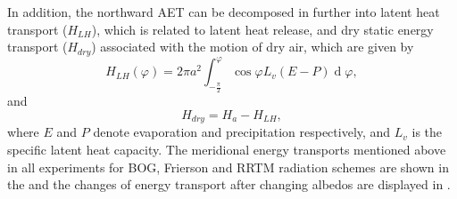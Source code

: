 In addition, the northward AET can be decomposed in further into latent heat transport ($H_{LH}$), which is related to latent heat release, and dry static energy transport ($H_{dry}$) associated with the motion of dry air, which are given by 
\begin{equation}
	H_{LH}(\varphi)= 2\pi a^2\int_{-\frac{\pi}{2}}^{\varphi}\operatorname{cos}\varphi  L_v(E-P)\operatorname{d}\varphi,
\end{equation}
and 
\begin{equation}
H_{dry}=H_a-H_{LH},
\end{equation}
where $E$ and $P$ denote evaporation and precipitation respectively, and $L_v$ is the specific latent heat capacity. The meridional energy transports mentioned above in all experiments for BOG, Frierson and RRTM radiation schemes are shown in the  and the changes of energy transport after changing albedos are displayed in .

